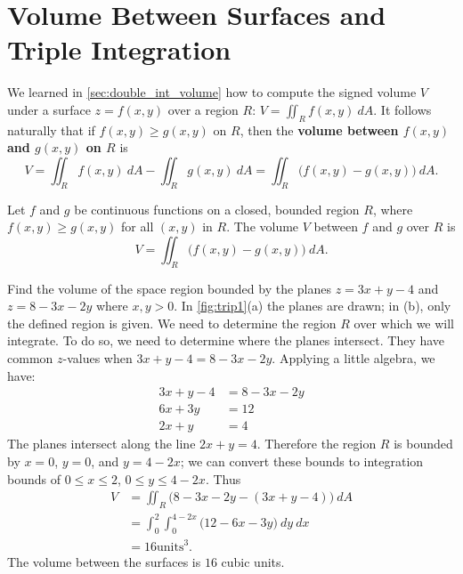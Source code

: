 \section{Volume Between Surfaces and Triple Integration}\label{sec:triple_int}

We learned in \autoref{sec:double_int_volume} how to compute the signed volume $V$ under a surface $z=f(x,y)$ over a region $R$: $V = \iint_R f(x,y)\ dA$. It follows naturally that if $f(x,y)\geq g(x,y)$ on $R$, then the \textbf{volume between $f(x,y)$ and $g(x,y)$ on $R$} is 
\[
V = \iint_R f(x,y)\ dA - \iint_R g(x,y)\ dA = \iint_R \big(f(x,y)-g(x,y)\big)\ dA.
\]

\begin{theorem}\label{thm:volume_between_surfaces}
Let $f$ and $g$ be continuous functions on a closed, bounded region $R$, where $f(x,y)\geq g(x,y)$ for all $(x,y)$ in $R$. The volume $V$ between $f$ and $g$ over $R$ is
\[V =\iint_R \big(f(x,y)-g(x,y)\big)\ dA.\]
\end{theorem}

\begin{example}\label{ex_trip1}
Find the volume of the space region bounded by the planes $z=3x+y-4$ and $z=8-3x-2y$ where $x,y>0$. In \autoref{fig:trip1}(a) the planes are drawn; in (b), only the defined region is given.
\solution
We need to determine the region $R$ over which we will integrate. To do so, we need to determine where the planes intersect. They have common $z$-values when $3x+y-4=8-3x-2y$. Applying a little algebra, we have:
\begin{align*}
3x+y-4 &= 8-3x-2y\\
6x+3y &=12\\
2x+y &=4
\end{align*}
The planes intersect along the line $2x+y=4$. Therefore the region $R$ is bounded by $x=0$, $y=0$, and $y=4-2x$; we can convert these bounds to integration bounds of $0\leq x\leq 2$, $0\leq y\leq 4-2x$. Thus
\begin{align*}
V &= \iint_R \big(8-3x-2y-(3x+y-4)\big)\ dA \\
	&= \int_0^2\int_0^{4-2x} \big(12-6x-3y\big)\ dy\ dx\\
	&= 16\text{units}^3.
\end{align*}
The volume between the surfaces is $16$ cubic units.
\end{example}


